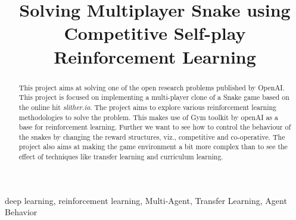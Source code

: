 \documentclass[conference,10pt]{IEEEtran}
\begin{document}
	\title{Solving Multiplayer Snake using Competitive Self-play Reinforcement Learning}

	\author{
		\and
		\and
	}

	\maketitle

	\begin{abstract}
		This project aims at solving one of the open research problems published by OpenAI\cite{n3}. This project is focused on implementing a multi-player clone of a Snake game based on the online hit \textit{slither.io}. The project aims to explore various reinforcement learning methodologies to solve the problem. This makes use of Gym toolkit by openAI as a base for reinforcement learning.  Further we want to see how to control the behaviour of the snakes by changing the reward structures, viz., competitive and co-operative. The project also aims at making the game environment a bit more complex than to see the effect of techniques like transfer learning and curriculum learning. 
	\end{abstract}

	\begin{IEEEkeywords}
		deep learning, reinforcement learning, Multi-Agent, Transfer Learning, Agent Behavior
	\end{IEEEkeywords}
\end{document}
